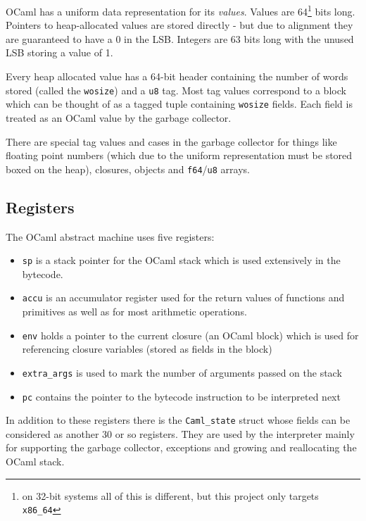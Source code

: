 OCaml has a uniform data representation for its \emph{values}. Values are 64\footnote{on 32-bit
    systems all of this is different, but this project only targets \texttt{x86\_64}} bits long.
Pointers to heap-allocated values are stored directly - but due to alignment they are guaranteed to
have a 0 in
the LSB. Integers are 63 bits long with the unused LSB storing a value of 1.

Every heap allocated value has a 64-bit header containing the number of words stored (called
the \texttt{wosize}) and a \texttt{u8} tag. Most tag values correspond to a block which can be
thought of as a tagged tuple containing \texttt{wosize} fields. Each field is treated as an OCaml
value by the garbage collector.

There are special tag values and cases in the garbage collector for things like floating point
numbers (which due to the uniform representation must be stored boxed on the heap),
closures, objects and \texttt{f64}/\texttt{u8} arrays.

\subsection{Registers}

The OCaml abstract machine uses five registers:

\begin{itemize}
    \item \texttt{sp} is a stack pointer for the OCaml stack which is used extensively
          in the bytecode.
    \item \texttt{accu} is an accumulator register used for the return values of functions
          and primitives as well as for most arithmetic operations.
    \item \texttt{env} holds a pointer to the current closure (an OCaml block) which is used for
          referencing closure variables (stored as fields in the block)
    \item \texttt{extra\_args} is used to mark the number of arguments passed on the stack
    \item \texttt{pc} contains the pointer to the bytecode instruction to be interpreted next
\end{itemize}

In addition to these registers there is the \texttt{Caml\_state} struct whose fields can be
considered as another 30 or so registers. They are used by the interpreter mainly for supporting
the garbage collector, exceptions and growing and reallocating the OCaml stack.

